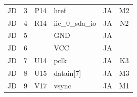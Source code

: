 \documentclass[../main.tex]{subfiles}%
\begin{document}
\begin{table}[h]
\begin{tabular}{ccclcc}
\rowcolor[HTML]{C0E6F5} 
JD                                             & 3                                        & P14                                      & href                                   & JA                                                                                       & M2                                                                                    \\
JD                                             & 4                                        & R14                                      & iic\_0\_sda\_io                        & JA                                                                                       & N2                                                                                    \\
\rowcolor[HTML]{C0E6F5} 
JD                                             & 5                                        &                                          & GND                                    & JA                                                                                       & \multicolumn{1}{l}{\cellcolor[HTML]{C0E6F5}}                                          \\
JD                                             & 6                                        &                                          & VCC                                    & JA                                                                                       & \multicolumn{1}{l}{}                                                                  \\
\rowcolor[HTML]{C0E6F5} 
JD                                             & 7                                        & U14                                      & pclk                                   & JA                                                                                       & K3                                                                                    \\
JD                                             & 8                                        & U15                                      & datain{[}7{]}                          & JA                                                                                       & M3                                                                                    \\
\rowcolor[HTML]{C0E6F5} 
JD                                             & 9                                        & V17                                      & vsync                                  & JA                                                                                       & M1                                                                                    \\

\end{tabular}
\end{table}
\end{document}
